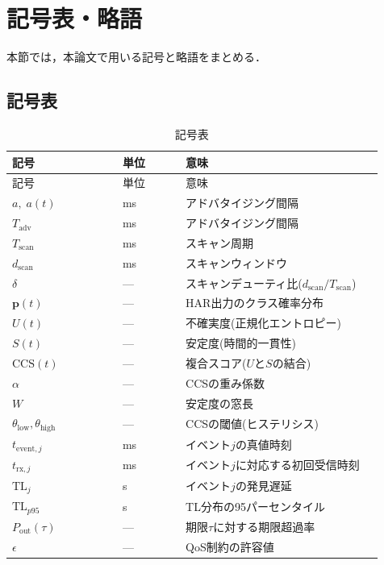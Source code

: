 ﻿%
\section{記号表・略語}
\label{sec:symbols}

本節では，本論文で用いる記号と略語をまとめる．

\subsection{記号表}
\begin{longtable}{p{0.28\linewidth}p{0.16\linewidth}p{0.50\linewidth}}
  \caption{記号表}\label{tab:symbols}\\
  \toprule
  記号 & 単位 & 意味 \\
  \midrule
  \endfirsthead
  \toprule
  記号 & 単位 & 意味 \\
  \midrule
  \endhead
  $a,\;a(t)$ & ms & アドバタイジング間隔 \\
  $T_{\mathrm{adv}}$ & ms & アドバタイジング間隔 \\
  $T_{\mathrm{scan}}$ & ms & スキャン周期 \\
  $d_{\mathrm{scan}}$ & ms & スキャンウィンドウ \\
  $\delta$ & --- & スキャンデューティ比($d_{\mathrm{scan}}/T_{\mathrm{scan}}$) \\
  $\mathbf{p}(t)$ & --- & HAR出力のクラス確率分布 \\
  $U(t)$ & --- & 不確実度(正規化エントロピー) \\
  $S(t)$ & --- & 安定度(時間的一貫性) \\
  $\mathrm{CCS}(t)$ & --- & 複合スコア($U$と$S$の結合) \\
  $\alpha$ & --- & CCSの重み係数 \\
  $W$ & --- & 安定度の窓長 \\
  $\theta_{\mathrm{low}},\theta_{\mathrm{high}}$ & --- & CCSの閾値(ヒステリシス) \\
  $t_{\mathrm{event},j}$ & ms & イベント$j$の真値時刻 \\
  $t_{\mathrm{rx},j}$ & ms & イベント$j$に対応する初回受信時刻 \\
  $\mathrm{TL}_j$ & s & イベント$j$の発見遅延 \\
  $\mathrm{TL}_{p95}$ & s & TL分布の95パーセンタイル \\
  $P_{\mathrm{out}}(\tau)$ & --- & 期限$\tau$に対する期限超過率 \\
  $\epsilon$ & --- & QoS制約の許容値 \\

\end{longtable}
